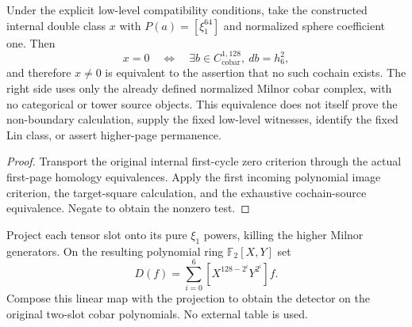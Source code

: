 \begin{proposition}
  \label{prop:h6-internal-square-pure-cobar-criterion}
  \leanok
  Under the explicit low-level compatibility conditions, take the
  constructed internal double class $x$ with $P(a)=[\xi_1^{64}]$ and
  normalized sphere coefficient one. Then
  \[
    x=0\quad\Longleftrightarrow\quad
    \exists b\in C^{1,128}_{\mathrm{cobar}},\ db=h_6^2,
  \]
  and therefore $x\ne0$ is equivalent to the assertion that no such
  cochain exists. The right side uses only the already defined normalized
  Milnor cobar complex, with no categorical or tower source objects.
  This equivalence does not itself prove the non-boundary calculation,
  supply the fixed low-level witnesses, identify the fixed Lin class,
  or assert higher-page permanence.
\end{proposition}
\begin{proof}
  Transport the original internal first-cycle zero criterion through
  the actual first-page homology equivalences. Apply the first incoming
  polynomial image criterion, the target-square calculation, and the
  exhaustive cochain-source equivalence. Negate to obtain the nonzero test.
  \leanok
\end{proof}

\begin{definition}
  \label{def:h6-cobar-square-detector}
  \leanok
  Project each tensor slot onto its pure $\xi_1$ powers, killing the
  higher Milnor generators. On the resulting polynomial ring
  $\mathbb F_2[X,Y]$ set
  \[
    D(f)=\sum_{i=0}^{6}[X^{128-2^i}Y^{2^i}]f.
  \]
  Compose this linear map with the projection to obtain the detector on
  the original two-slot cobar polynomials. No external table is used.
\end{definition}

